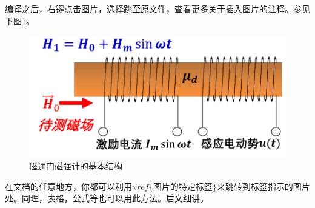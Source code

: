 编译之后，右键点击图片，选择跳至原文件，查看更多关于插入图片的注释。参见下图\ref{fig00}。\par
\begin{figure}[H]%
\label{fig00}%
\centering%
\includegraphics[width=11.5cm]{PICS/fluxgate.png}%
\caption{磁通门磁强计的基本结构}%
\end{figure}%
在文档的任意地方，你都可以利用$\backslash ref\{$图片的特定标签$\}$来跳转到标签指示的图片处。同理，表格，公式等也可以用此方法。后文细讲。